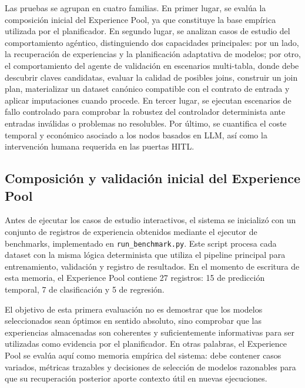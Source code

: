 \documentclass[12pt,a4paper]{article}
\theoremstyle{plain}
\begin{document}
Las pruebas se agrupan en cuatro familias. En primer lugar, se evalúa la composición inicial del Experience Pool, ya que constituye la base empírica utilizada por el planificador. En segundo lugar, se analizan casos de estudio del comportamiento agéntico, distinguiendo dos capacidades principales: por un lado, la recuperación de experiencias y la planificación adaptativa de modelos; por otro, el comportamiento del agente de validación en escenarios multi-tabla, donde debe descubrir claves candidatas, evaluar la calidad de posibles joins, construir un join plan, materializar un dataset canónico compatible con el contrato de entrada y aplicar imputaciones cuando procede. En tercer lugar, se ejecutan escenarios de fallo controlado para comprobar la robustez del controlador determinista ante entradas inválidas o problemas no resolubles. Por último, se cuantifica el coste temporal y económico asociado a los nodos basados en LLM, así como la intervención humana requerida en las puertas HITL.


\subsection{Composición y validación inicial del Experience Pool}
\label{sec:pool-evaluacion}

Antes de ejecutar los casos de estudio interactivos, el sistema se inicializó con un conjunto de registros de experiencia obtenidos mediante el ejecutor de benchmarks, implementado en \texttt{run\_benchmark.py}. Este script procesa cada dataset con la misma lógica determinista que utiliza el pipeline principal para entrenamiento, validación y registro de resultados. En el momento de escritura de esta memoria, el Experience Pool contiene 27 registros: 15 de predicción temporal, 7 de clasificación y 5 de regresión.

El objetivo de esta primera evaluación no es demostrar que los modelos seleccionados sean óptimos en sentido absoluto, sino comprobar que las experiencias almacenadas son coherentes y suficientemente informativas para ser utilizadas como evidencia por el planificador. En otras palabras, el Experience Pool se evalúa aquí como memoria empírica del sistema: debe contener casos variados, métricas trazables y decisiones de selección de modelos razonables para que su recuperación posterior aporte contexto útil en nuevas ejecuciones.
\end{document}

